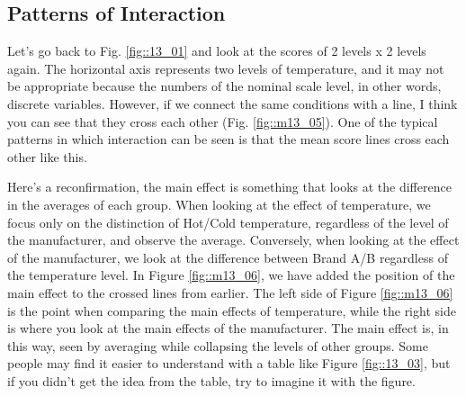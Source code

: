 \documentclass{ltjbook}
\begin{document}
\subsection{Patterns of Interaction}
Let's go back to Fig. \ref{fig::13_01} and look at the scores of 2 levels x 2 levels again. The horizontal axis represents two levels of temperature, and it may not be appropriate because the numbers of the nominal scale level, in other words, discrete variables. However, if we connect the same conditions with a line, I think you can see that they cross each other (Fig. \ref{fig::m13_05}). One of the typical patterns in which interaction can be seen is that the mean score lines cross each other like this.



Here's a reconfirmation, the main effect is something that looks at the difference in the averages of each group. When looking at the effect of temperature, we focus only on the distinction of Hot/Cold temperature, regardless of the level of the manufacturer, and observe the average.
Conversely, when looking at the effect of the manufacturer, we look at the difference between Brand A/B regardless of the temperature level. In Figure \ref{fig::m13_06}, we have added the position of the main effect to the crossed lines from earlier.
The left side of Figure \ref{fig::m13_06} is the point when comparing the main effects of temperature, while the right side is where you look at the main effects of the manufacturer. The main effect is, in this way, seen by averaging while collapsing the levels of other groups. Some people may find it easier to understand with a table like Figure \ref{fig::13_03}, but if you didn't get the idea from the table, try to imagine it with the figure.
\end{document}
